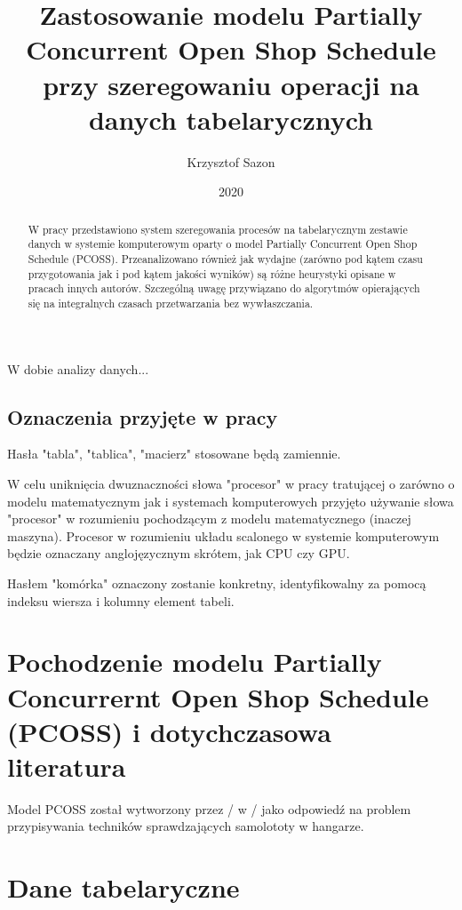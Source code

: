 \documentclass[brudnopis]{xmgr}
\author   {Krzysztof Sazon}
\title    {Zastosowanie modelu Partially Concurrent Open Shop Schedule przy szeregowaniu operacji na danych tabelarycznych}
\date     {2020}
\begin{document}
\begin{abstract}
W pracy przedstawiono system szeregowania procesów na tabelarycznym zestawie danych w systemie komputerowym oparty o model Partially Concurrent Open Shop Schedule (PCOSS).
Przeanalizowano również jak wydajne (zarówno pod kątem czasu przygotowania jak i pod kątem jakości wyników) są różne heurystyki opisane w pracach innych autorów.
Szczególną uwagę przywiązano do algorytmów opierających się na integralnych czasach przetwarzania bez wywłaszczania.
\end{abstract}


\maketitle

\introduction

W dobie analizy danych...

\section{Oznaczenia przyjęte w pracy}

Hasła "tabla", "tablica", "macierz" stosowane będą zamiennie.

W celu uniknięcia dwuznaczności słowa "procesor" w pracy tratującej o zarówno o modelu matematycznym jak i systemach komputerowych przyjęto używanie słowa "procesor" w rozumieniu pochodzącym z modelu matematycznego (inaczej maszyna).
Procesor w rozumieniu układu scalonego w systemie komputerowym będzie oznaczany anglojęzycznym skrótem, jak CPU czy GPU.

Hasłem "komórka" oznaczony zostanie konkretny, identyfikowalny za pomocą indeksu wiersza i kolumny element tabeli.

\chapter{Pochodzenie modelu Partially Concurrernt Open Shop Schedule (PCOSS) i dotychczasowa literatura}

Model PCOSS został wytworzony przez / w / jako odpowiedź na problem przypisywania techników sprawdzających samolototy w hangarze.

\chapter{Dane tabelaryczne}
\end{document}
